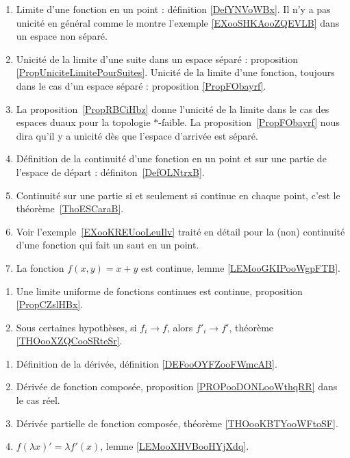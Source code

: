     \label{THEMEooGVCCooHBrNNd}

\begin{enumerate}
    \item
        Limite d'une fonction en un point : définition \ref{DefYNVoWBx}. Il n'y a pas unicité en général comme le montre l'exemple \ref{EXooSHKAooZQEVLB} dans un espace non séparé.
    \item
        Unicité de la limite d'une suite dans un espace séparé : proposition \ref{PropUniciteLimitePourSuites}. Unicité de la limite d'une fonction, toujours dans le cas d'un espace séparé : proposition \ref{PropFObayrf}.
    \item
        La proposition~\ref{PropRBCiHbz} donne l'unicité de la limite dans le cas des espaces duaux pour la topologie \( *\)-faible. La proposition~\ref{PropFObayrf} nous dira qu'il y a unicité dès que l'espace d'arrivée est séparé.
    \item
        Définition de la continuité d'une fonction en un point et sur une partie de l'espace de départ : définiton~\ref{DefOLNtrxB}.
    \item
        Continuité sur une partie si et seulement si continue en chaque point, c'est le théorème~\ref{ThoESCaraB}.
    \item
        Voir l'exemple~\ref{EXooKREUooLeuIlv} traité en détail pour la (non) continuité d'une fonction qui fait un saut en un point.
    \item
        La fonction \( f(x,y)=x+y\) est continue, lemme \ref{LEMooGKIPooWgpFTB}.
\end{enumerate}

\begin{enumerate}
    \item
        Une limite uniforme de fonctions continues est continue, proposition \ref{PropCZslHBx}.
    \item
        Sous certaines hypothèses, si \( f_i\to f\), alors \( f'_i\to f'\), théorème \ref{THOooXZQCooSRteSr}.
\end{enumerate}

\begin{enumerate}
    \item
        Définition de la dérivée, définition \ref{DEFooOYFZooFWmcAB}.
    \item
        Dérivée de fonction composée, proposition \ref{PROPooDONLooWthqRR} dans le cas réel.
    \item
        Dérivée partielle de fonction composée, théorème \ref{THOooKBTYooWFtoSF}.
    \item
        \( f(\lambda x)'=\lambda f'(x)\), lemme \ref{LEMooXHVBooHYjXdq}.
\end{enumerate}

